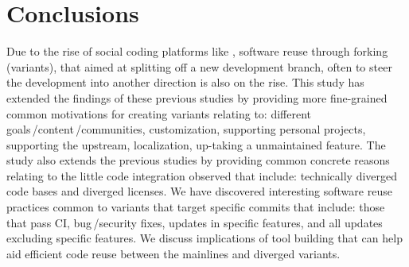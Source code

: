\section{Conclusions}
Due to the rise of social coding platforms like \gh, software reuse through forking (variants), that aimed at splitting off a new development branch, often to steer the development into another direction is also on the rise. 
This study has extended the findings of these previous studies by providing more fine-grained common motivations for creating variants relating to: different goals\,/content\,/communities, customization, supporting personal projects, supporting the upstream, localization, up-taking a unmaintained feature.
The study also extends the previous studies by providing common concrete reasons relating to the little code integration observed that include: technically diverged code bases and diverged licenses.
We have discovered interesting software reuse practices common to variants that target specific commits that include: those that pass CI, bug\,/security fixes, updates in specific features, and all updates excluding specific features. We
discuss implications of tool building that can help aid efficient code reuse between the mainlines and diverged variants.